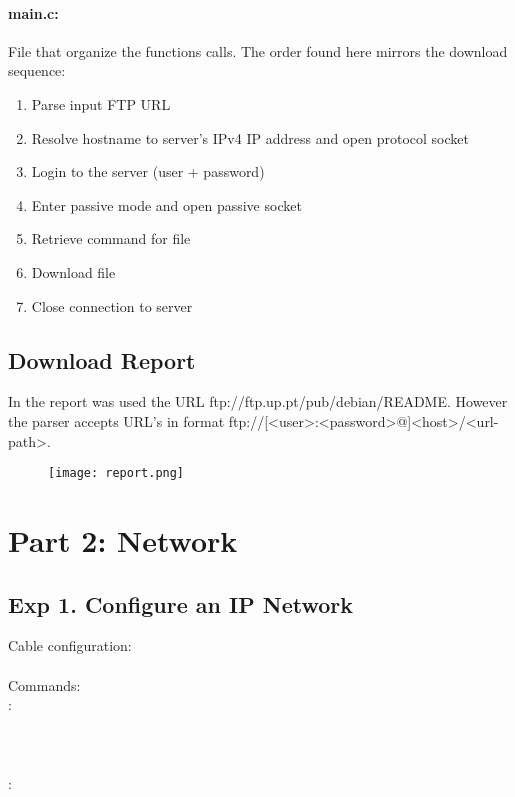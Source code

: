 \documentclass[compilation.tex]{subfiles}
\begin{document}
	\paragraph{main.c:}
	File that organize the functions calls. The order found here mirrors the download sequence: 
	\begin{enumerate}
		\item Parse input FTP URL
		\item Resolve hostname to server's IPv4 IP address and open protocol socket
		\item Login to the server (user + password)
		\item Enter passive mode and open passive socket
		\item Retrieve command for file
		\item Download file
		\item Close connection to server
	\end{enumerate}
	
	\subsection{Download Report}
	In the report was used the URL ftp://ftp.up.pt/pub/debian/README. However the parser accepts URL's in format ftp://[<user>:<password>@]<host>/<url-path>.
	
	
	\begin{figure}[htb]
		\centering
		\texttt{[image: report.png]}
		\label{fig:report success}
	\end{figure}
	
	
	\section{Part 2: Network}
	\label{sec:network}
	
	\clearpage
	\subsection[Configure an IP Network]{Exp 1. Configure an IP Network}
	\label{subsec:exp1}
	
	\begin{cables}{7}{0.40}
		Cable configuration:\\
		\\
		
		Commands:\\
		:\\
		\\
		\\
		\\
		:\\
		\\
	\end{cables}
	
\end{document}
